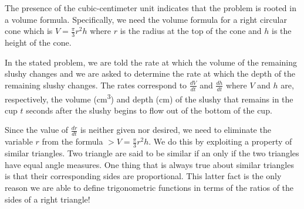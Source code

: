 \documentclass[12pt,]{book}
\theoremstyle{plain}
\theoremstyle{definition}
\numberwithin{equation}{section}
\newcounter{figstack}
\newlength\fight
\newcommand\pushValignCaptionBottom[5][b]{%
\stepcounter{figstack}%
\expandafter\def\csname %
figalign\romannumeral\value{figstack}\endcsname{#1}%
\expandafter\def\csname %
figtype\romannumeral\value{figstack}\endcsname{#2}%
\expandafter\def\csname %
figwd\romannumeral\value{figstack}\endcsname{#3}%
\expandafter\def\csname %
figcontent\romannumeral\value{figstack}\endcsname{#4}%
\expandafter\def\csname %
figcap\romannumeral\value{figstack}\endcsname{#5}%
\setbox0=\hbox{%
\begin{#2}{#3}#4\end{#2}}%
\ifdim\dimexpr\ht0+\dp0\relax>\fight\global\setlength{\fight}{%
\dimexpr\ht0+\dp0\relax}\fi%
}
\newcommand{\lz}[2]{\frac{d#1}{d#2}}
\begin{document}
\begin{exerciselist}
\par
The presence of the cubic-centimeter unit indicates that the problem is rooted in a volume formula. Specifically, we need the volume formula for a right circular cone which is \(V=\frac{\pi}{3}r^2h\) where \(r\) is the radius at the top of the cone and \(h\) is the height of the cone.%
\par
In the stated problem, we are told the rate at which the volume of the remaining slushy changes and we are asked to determine the rate at which the depth of the remaining slushy changes. The rates correspond to \(\lz{V}{t}\) and \(\lz{h}{t}\) where \(V\) and \(h\) are, respectively, the volume (\si{\centi\meter\tothe{3}}) and depth (\si{\centi\meter}) of the slushy that remains in the cup \(t\) seconds after the slushy begins to flow out of the bottom of the cup.%
\par
Since the value of \(\lz{r}{t}\) is neither given nor desired, we need to eliminate the variable \(r\) from the formula \(>V=\frac{\pi}{3}r^2h\). We do this by exploiting a property of similar triangles. Two triangle are said to be similar if an only if the two triangles have equal angle measures. One thing that is always true about similar triangles is that their corresponding sides are proportional. This latter fact is the only reason we are able to define trigonometric functions in terms of the ratios of the sides of a right triangle!%
\end{exerciselist}
\end{document}
